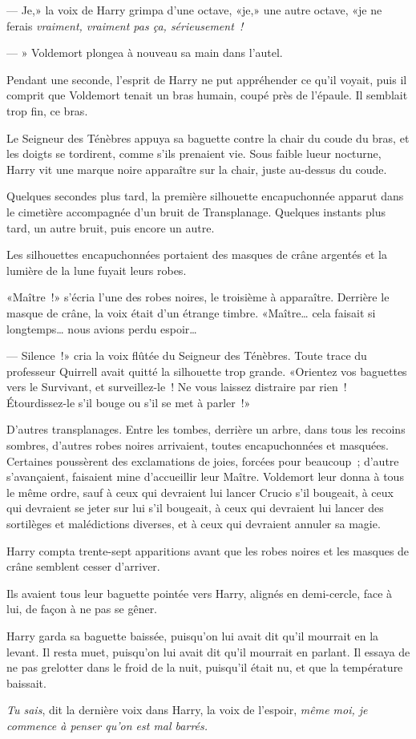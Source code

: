 --- Je,» la voix de Harry grimpa d'une octave, «je,» une autre octave, «je ne ferais \emph{vraiment, vraiment pas ça, sérieusement~!}

--- » Voldemort plongea à nouveau sa main dans l'autel.

Pendant une seconde, l'esprit de Harry ne put appréhender ce qu'il voyait, puis il comprit que Voldemort tenait un bras humain, coupé près de l'épaule. Il semblait trop fin, ce bras.

Le Seigneur des Ténèbres appuya sa baguette contre la chair du coude du bras, et les doigts se tordirent, comme s'ils prenaient vie. Sous faible lueur nocturne, Harry vit une marque noire apparaître sur la chair, juste au-dessus du coude.

Quelques secondes plus tard, la première silhouette encapuchonnée apparut dans le cimetière accompagnée d'un bruit de Transplanage. Quelques instants plus tard, un autre bruit, puis encore un autre.

Les silhouettes encapuchonnées portaient des masques de crâne argentés et la lumière de la lune fuyait leurs robes.

«Maître~!» s'écria l'une des robes noires, le troisième à apparaître. Derrière le masque de crâne, la voix était d'un étrange timbre. «Maître… cela faisait si longtemps… nous avions perdu espoir…

--- Silence~!» cria la voix flûtée du Seigneur des Ténèbres. Toute trace du professeur Quirrell avait quitté la silhouette trop grande. «Orientez vos baguettes vers le Survivant, et surveillez-le~! Ne vous laissez distraire par rien~! Étourdissez-le s'il bouge ou s'il se met à parler~!»

D'autres transplanages. Entre les tombes, derrière un arbre, dans tous les recoins sombres, d'autres robes noires arrivaient, toutes encapuchonnées et masquées. Certaines poussèrent des exclamations de joies, forcées pour beaucoup~; d'autre s'avançaient, faisaient mine d'accueillir leur Maître. Voldemort leur donna à tous le même ordre, sauf à ceux qui devraient lui lancer Crucio s'il bougeait, à ceux qui devraient se jeter sur lui s'il bougeait, à ceux qui devraient lui lancer des sortilèges et malédictions diverses, et à ceux qui devraient annuler sa magie.

Harry compta trente-sept apparitions avant que les robes noires et les masques de crâne semblent cesser d'arriver.

Ils avaient tous leur baguette pointée vers Harry, alignés en demi-cercle, face à lui, de façon à ne pas se gêner.

Harry garda sa baguette baissée, puisqu'on lui avait dit qu'il mourrait en la levant. Il resta muet, puisqu'on lui avait dit qu'il mourrait en parlant. Il essaya de ne pas grelotter dans le froid de la nuit, puisqu'il était nu, et que la température baissait.

\emph{Tu sais}, dit la dernière voix dans Harry, la voix de l'espoir, \emph{même moi, je commence à penser qu'on est mal barrés.} 

